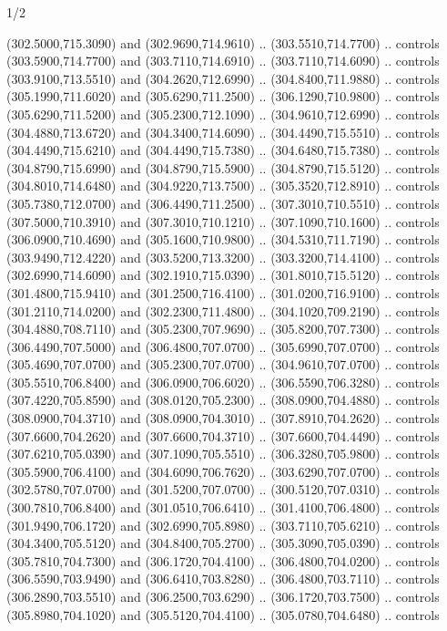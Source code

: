 \begin{flagdescription}{1/2}
\begin{scope}[xshift=0.5\flaglength]
\begin{scope}[scale=0.00745\flagwidth,xshift=-12.1mm,yshift=41.7mm]
\begin{scope}[y=0.80pt, x=0.80pt, yscale=-1, xscale=1, inner sep=0pt, outer sep=0pt]
\begin{scope}[cm={{1.33333,0.0,0.0,-1.33333,(0.0,114.66667)}}]
\begin{scope}[scale=0.100]
  (302.5000,715.3090) and (302.9690,714.9610) .. (303.5510,714.7700) .. controls
  (303.5900,714.7700) and (303.7110,714.6910) .. (303.7110,714.6090) .. controls
  (303.9100,713.5510) and (304.2620,712.6990) .. (304.8400,711.9880) .. controls
  (305.1990,711.6020) and (305.6290,711.2500) .. (306.1290,710.9800) .. controls
  (305.6290,711.5200) and (305.2300,712.1090) .. (304.9610,712.6990) .. controls
  (304.4880,713.6720) and (304.3400,714.6090) .. (304.4490,715.5510) .. controls
  (304.4490,715.6210) and (304.4490,715.7380) .. (304.6480,715.7380) .. controls
  (304.8790,715.6990) and (304.8790,715.5900) .. (304.8790,715.5120) .. controls
  (304.8010,714.6480) and (304.9220,713.7500) .. (305.3520,712.8910) .. controls
  (305.7380,712.0700) and (306.4490,711.2500) .. (307.3010,710.5510) .. controls
  (307.5000,710.3910) and (307.3010,710.1210) .. (307.1090,710.1600) .. controls
  (306.0900,710.4690) and (305.1600,710.9800) .. (304.5310,711.7190) .. controls
  (303.9490,712.4220) and (303.5200,713.3200) .. (303.3200,714.4100) .. controls
  (302.6990,714.6090) and (302.1910,715.0390) .. (301.8010,715.5120) .. controls
  (301.4800,715.9410) and (301.2500,716.4100) .. (301.0200,716.9100) .. controls
  (301.2110,714.0200) and (302.2300,711.4800) .. (304.1020,709.2190) .. controls
  (304.4880,708.7110) and (305.2300,707.9690) .. (305.8200,707.7300) .. controls
  (306.4490,707.5000) and (306.4800,707.0700) .. (305.6990,707.0700) .. controls
  (305.4690,707.0700) and (305.2300,707.0700) .. (304.9610,707.0700) .. controls
  (305.5510,706.8400) and (306.0900,706.6020) .. (306.5590,706.3280) .. controls
  (307.4220,705.8590) and (308.0120,705.2300) .. (308.0900,704.4880) .. controls
  (308.0900,704.3710) and (308.0900,704.3010) .. (307.8910,704.2620) .. controls
  (307.6600,704.2620) and (307.6600,704.3710) .. (307.6600,704.4490) .. controls
  (307.6210,705.0390) and (307.1090,705.5510) .. (306.3280,705.9800) .. controls
  (305.5900,706.4100) and (304.6090,706.7620) .. (303.6290,707.0700) .. controls
  (302.5780,707.0700) and (301.5200,707.0700) .. (300.5120,707.0310) .. controls
  (300.7810,706.8400) and (301.0510,706.6410) .. (301.4100,706.4800) .. controls
  (301.9490,706.1720) and (302.6990,705.8980) .. (303.7110,705.6210) .. controls
  (304.3400,705.5120) and (304.8400,705.2700) .. (305.3090,705.0390) .. controls
  (305.7810,704.7300) and (306.1720,704.4100) .. (306.4800,704.0200) .. controls
  (306.5590,703.9490) and (306.6410,703.8280) .. (306.4800,703.7110) .. controls
  (306.2890,703.5510) and (306.2500,703.6290) .. (306.1720,703.7500) .. controls
  (305.8980,704.1020) and (305.5120,704.4100) .. (305.0780,704.6480) .. controls

\end{scope}
\end{scope}
\end{scope}
\end{scope}
\end{scope}
\end{flagdescription}
